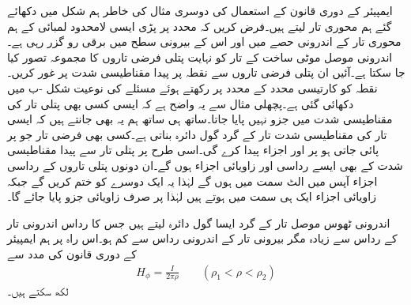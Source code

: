ایمپیئر کے دوری قانون  کے استعمال کی دوسری مثال کی خاطر ہم شکل  میں دکھائے گئے ہم محوری تار لیتے ہیں۔فرض کریں کہ  محدد پر پڑی  ایسی لامحدود لمبائی کے ہم محوری  تار کے اندرونی حصے میں  اور اس کے بیرونی سطح میں  برقی رو گزر رہی ہے۔اندرونی موصل موٹی ساخت کے تار کو نہایت پتلی فرضی تاروں کا مجموعہ تصور کیا جا سکتا ہے۔آئیں ان پتلی فرضی تاروں سے نقطہ  پر پیدا مقناطیسی شدت پر غور کریں۔نقطہ  کو کارتیسی محدد کے  محدد پر رکھتے ہوئے مسئلے کی نوعیت شکل -ب میں دکھائی گئی ہے۔پچھلی مثال سے یہ واضح ہے کہ ایسی کسی بھی پتلی تار کی مقناطیسی شدت میں  جزو نہیں پایا جاتا۔ساتھ ہی ساتھ ہم یہ بھی جانتے ہیں کہ ایسی تار کی مقناطیسی شدت تار کے گرد گول دائرہ بناتی ہے۔کسی بھی فرضی تار جو  پر پائی جاتی ہو  پر   اور  اجزاء پیدا کرے گی۔اسی طرح  پر پتلی تار سے پیدا مقناطیسی شدت کے بھی ایسے رداسی اور زاویائی اجزاء ہوں گے۔ان دونوں پتلی تاروں کے رداسی اجزاء آپس میں الٹ سمت میں ہوں گے لہٰذا یہ ایک دوسرے کو ختم کریں گے جبکہ زاویائی اجزاء ایک ہی سمت میں ہوتے ہیں لہٰذا  پر صرف زاویائی جزو پایا جائے گا۔

اندرونی ٹھوس موصل تار کے گرد ایسا گول دائرہ لیتے ہیں جس کا رداس  اندرونی تار کے رداس  سے زیادہ مگر بیرونی تار کے اندرونی رداس  سے کم ہو۔اس راہ پر ہم ایمپیئر کے دوری قانون کی مدد سے
\begin{align}\label{مساوات_مقناطیسی_ہم_محوری_تاروں_کے_درمیان_شدت}
H_{\phi}=\frac{I}{2\pi \rho} \quad \quad (\rho_1 < \rho <\rho_2)
\end{align}
لکھ سکتے ہیں۔

